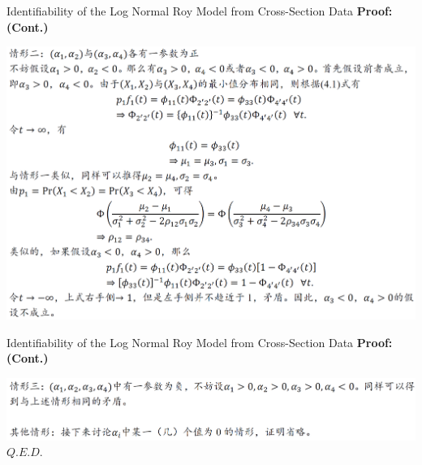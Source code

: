\documentclass{beamer}
\begin{document}
\begin{frame}{Identifiability of the Log Normal Roy Model from Cross-Section Data}
	\textbf{Proof:(Cont.)}
	
	\includegraphics[scale=0.44]{theorem4_6}
\end{frame}
\begin{frame}{Identifiability of the Log Normal Roy Model from Cross-Section Data}
	\textbf{Proof:(Cont.)}
	
	\includegraphics[scale=0.5]{theorem4_7}
	\hfill $Q.E.D.$
\end{frame}
\end{document}
